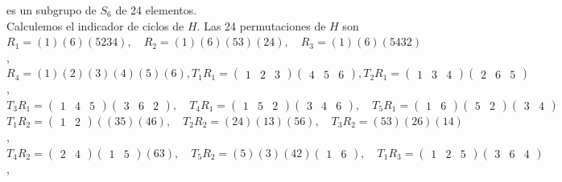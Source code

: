\documentclass[10pt]{article}
\begin{document}
es un subgrupo de $S_{6}$ de 24 elementos.\\
Calculemos el indicador de ciclos de $H$. Las 24 permutaciones de $H$ son\\
$R_{1}=(1)(6)(5234), \quad R_{2}=(1)(6)(53)(24), \quad R_{3}=(1)(6)(5432)$,\\
$R_{4}=(1)(2)(3)(4)(5)(6), T_{1} R_{1}=\left(\begin{array}{lll}1 & 2 & 3\end{array}\right)\left(\begin{array}{lll}4 & 5 & 6\end{array}\right), T_{2} R_{1}=\left(\begin{array}{lll}1 & 3 & 4\end{array}\right)\left(\begin{array}{lll}2 & 6 & 5\end{array}\right)$,\\
$T_{3} R_{1}=\left(\begin{array}{lll}1 & 4 & 5\end{array}\right)\left(\begin{array}{lll}3 & 6 & 2\end{array}\right), \quad T_{4} R_{1}=\left(\begin{array}{lll}1 & 5 & 2\end{array}\right)\left(\begin{array}{lll}3 & 4 & 6\end{array}\right), \quad T_{5} R_{1}=\left(\begin{array}{ll}1 & 6\end{array}\right)\left(\begin{array}{ll}5 & 2\end{array}\right)\left(\begin{array}{ll}3 & 4\end{array}\right)$\\
$T_{1} R_{2}=\left(\begin{array}{ll}1 & 2\end{array}\right)\left((35)(46), \quad T_{2} R_{2}=(24)(13)(56), \quad T_{3} R_{2}=(53)(26)(14)\right.$,\\
$T_{4} R_{2}=\left(\begin{array}{ll}2 & 4\end{array}\right)\left(\begin{array}{ll}1 & 5\end{array}\right)(63), \quad T_{5} R_{2}=(5)(3)(42)\left(\begin{array}{ll}1 & 6\end{array}\right), \quad T_{1} R_{3}=\left(\begin{array}{lll}1 & 2 & 5\end{array}\right)\left(\begin{array}{lll}3 & 6 & 4\end{array}\right)$,\\
\end{document}
